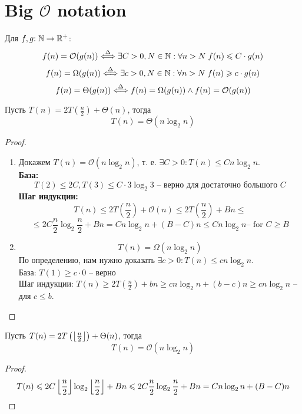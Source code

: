 \section{Big $\mathcal{O}$ notation}

\begin{definition}
    Для $f, g{:}\; \mathbb{N} \rightarrow \mathbb{R}^{+}$:
    \[ f(n) = \mathcal{O}(g(n)) \stackrel{\Delta}{\Longleftrightarrow} \exists C > 0, N \in \mathbb{N}: \forall n > N \; f(n) \leqslant C \cdot g(n) \]
    \[ f(n) = \Omega(g(n)) \stackrel{\Delta}{\Longleftrightarrow} \exists c > 0, N \in \mathbb{N}: \forall n > N \; f(n) \geqslant c \cdot g(n) \]
    \[ f(n) = \Theta(g(n)) \stackrel{\Delta}{\Longleftrightarrow} f(n) = \Omega(g(n)) \wedge f(n) = \mathcal{O}(g(n)) \]
\end{definition}

\begin{example}
    Пусть $T(n) = 2 T(\frac{n}{2}) + \Theta(n)$, тогда
    \[ T(n) = \Theta(n \log_2{n}) \]
\end{example}
\begin{proof}\phantom\\
\begin{enumerate}
\item
    Докажем $T(n) = \mathcal{O}(n \log_2{n})$, т. е. $\exists C > 0 : T(n) \le Cn \log_2{n}$. \\
    \textbf{База:}
        \[ T(2) \le 2C, T(3) \le C \cdot 3 \log_2{3} \text{ -- верно для достаточно большого $C$} \]
    \textbf{Шаг индукции:}
        \[
            T(n) \le
            2 T(\frac{n}{2}) + \mathcal{O}(n) \le
            2 T(\frac{n}{2}) + B n \le
        \]\[
            \le 2 C \frac{n}{2} \log_2{\frac{n}{2}} + Bn =
            C n \log_2{n} + (B - C)n \le C n \log_2{n}
            \text{-- for $C \ge B$}
        \]
\item
    \[ T(n) = \Omega(n \log_2{n}) \]
    По определению, нам нужно доказать $\exists c > 0 : T(n) \le cn \log_2{n}$. \\
    База: $T(1) \ge c \cdot 0$ -- верно \\
    Шаг индукции: $T(n) \ge 2T(\frac{n}{2}) + bn \ge cn \log_2{n} + (b - c) n \ge cn \log_2{n} $ -- для $c \le b$.
\end{enumerate}
\end{proof}

\begin{example}
    Пусть $T(n) = 2 T\left(\left\lfloor\frac n 2\right\rfloor\right) + \Theta(n)$, тогда
    \[ T(n) = \mathcal{O}(n \log_2 n) \]
\end{example}
\begin{proof}
    \[ T(n) \leqslant 2C \left\lfloor\frac n 2\right\rfloor \log_2 \left\lfloor\frac n 2\right\rfloor + Bn \leqslant 2C \frac n 2 \log_2 \frac n 2 + Bn = C n \log_2 n + (B - C)n  \]
\end{proof}


